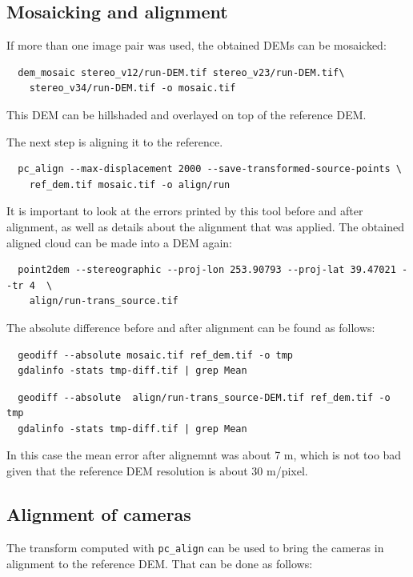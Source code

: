 \subsection{Mosaicking and alignment}

If more than one image pair was used, the obtained DEMs can be mosaicked:

\begin{verbatim}
  dem_mosaic stereo_v12/run-DEM.tif stereo_v23/run-DEM.tif\
    stereo_v34/run-DEM.tif -o mosaic.tif
\end{verbatim}

This DEM can be hillshaded and overlayed on top of the 
reference DEM.

The next step is aligning it to the reference. 
\begin{verbatim}
  pc_align --max-displacement 2000 --save-transformed-source-points \
    ref_dem.tif mosaic.tif -o align/run
\end{verbatim}

It is important to look at the errors printed by this tool
before and after alignment, as well as details about the alignment
that was applied. The obtained aligned cloud can be made into a DEM again:

\begin{verbatim}
  point2dem --stereographic --proj-lon 253.90793 --proj-lat 39.47021 --tr 4  \
    align/run-trans_source.tif
\end{verbatim}

The absolute difference before and after alignment can be found as 
follows:

\begin{verbatim}
  geodiff --absolute mosaic.tif ref_dem.tif -o tmp 
  gdalinfo -stats tmp-diff.tif | grep Mean
\end{verbatim}

\begin{verbatim}
  geodiff --absolute  align/run-trans_source-DEM.tif ref_dem.tif -o tmp 
  gdalinfo -stats tmp-diff.tif | grep Mean
\end{verbatim}

In this case the mean error after alignemnt was about 7 m, 
which is not too bad given that the reference DEM resolution is about
30 m/pixel.

\subsection{Alignment of cameras}

The transform computed with \texttt{pc\_align} can be used
to bring the cameras in alignment to the reference DEM. That can 
be done as follows:

